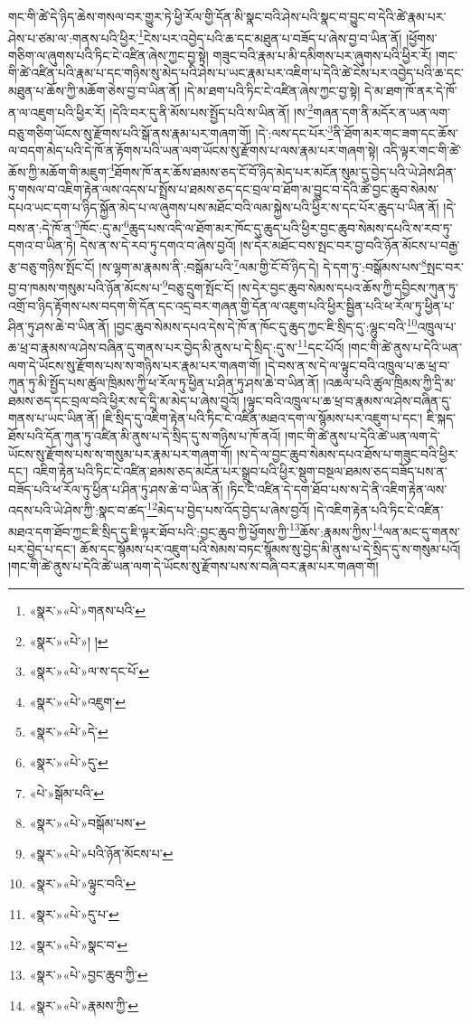 གང་གི་ཚེ་དེ་ཉིད་ཆེས་གསལ་བར་གྱུར་ཏེ་ཕྱི་རོལ་གྱི་དོན་མི་སྣང་བའི་ཤེས་པའི་སྣང་བ་བྱུང་བ་དེའི་ཚེ་རྣམ་པར་ཤེས་པ་ཙམ་ལ་:གནས་པའི་ཕྱིར་\footnote{«སྣར་»«པེ་»གནས་པའི་}ངེས་པར་འབྱེད་པའི་ཆ་དང་མཐུན་པ་བཟོད་པ་ཞེས་བྱ་བ་ཡིན་ནོ། །ཕྱོགས་གཅིག་ལ་ཞུགས་པའི་ཏིང་ངེ་འཛིན་ཞེས་ཀྱང་བྱ་སྟེ། གཟུང་བའི་རྣམ་པ་མི་དམིགས་པར་ཞུགས་པའི་ཕྱིར་རོ། །གང་གི་ཚེ་འཛིན་པའི་རྣམ་པ་དང་གཉིས་སུ་མེད་པའི་ཤེས་པ་ཡང་རྣམ་པར་འཇིག་པ་དེའི་ཚེ་ངེས་པར་འབྱེད་པའི་ཆ་དང་མཐུན་པ་ཆོས་ཀྱི་མཆོག་ཅེས་བྱ་བ་ཡིན་ནོ། །དེ་མ་ཐག་པའི་ཏིང་ངེ་འཛིན་ཞེས་ཀྱང་བྱ་སྟེ། དེ་མ་ཐག་ཁོ་ནར་དེ་ཁོ་ན་ལ་འཇུག་པའི་ཕྱིར་རོ། །དེའི་བར་དུ་ནི་མོས་པས་སྤྱོད་པའི་ས་ཡིན་ནོ། །ས་\footnote{«སྣར་»«པེ་»། །}གཞན་དག་ནི་མདོར་ན་ཡན་ལག་བཅུ་གཅིག་ཡོངས་སུ་རྫོགས་པའི་སྒོ་ནས་རྣམ་པར་གཞག་གོ། །དེ་:ལས་དང་པོར་\footnote{«སྣར་»«པེ་»ལ་ས་དང་པོ་}ནི་ཐོག་མར་གང་ཟག་དང་ཆོས་ལ་བདག་མེད་པའི་དེ་ཁོ་ན་རྟོགས་པའི་ཡན་ལག་ཡོངས་སུ་རྫོགས་པ་ལས་རྣམ་པར་གཞག་སྟེ། འདི་ལྟར་གང་གི་ཚེ་ཆོས་ཀྱི་མཆོག་གི་མཇུག་\footnote{«སྣར་»«པེ་»འཇུག་}ཐོགས་ཁོ་ནར་ཆོས་ཐམས་ཅད་ངོ་བོ་ཉིད་མེད་པར་མངོན་སུམ་དུ་བྱེད་པའི་ཡེ་ཤེས་ཤིན་ཏུ་གསལ་བ་འཇིག་རྟེན་ལས་འདས་པ་སྤྲོས་པ་ཐམས་ཅད་དང་བྲལ་བ་ཐོག་མ་བྱུང་བ་དེའི་ཚེ་བྱང་ཆུབ་སེམས་དཔའ་ཡང་དག་པ་ཉིད་སྐྱོན་མེད་པ་ལ་ཞུགས་པས་མཐོང་བའི་ལམ་སྐྱེས་པའི་ཕྱིར་ས་དང་པོར་ཆུད་པ་ཡིན་ནོ། །དེ་བས་ན་:དེ་ཁོ་ན་\footnote{«སྣར་»«པེ་»དེ་}ཁོང་:དུ་མ་\footnote{«སྣར་»«པེ་»དུ་}ཆུད་པས་འདི་ལ་ཐོག་མར་ཁོང་དུ་ཆུད་པའི་ཕྱིར་བྱང་ཆུབ་སེམས་དཔའི་ས་རབ་ཏུ་དགའ་བ་ཡིན་ཏེ། དེས་ན་ས་དེ་རབ་ཏུ་དགའ་བ་ཞེས་བྱའོ། །ས་དེར་མཐོང་བས་སྤང་བར་བྱ་བའི་ཉོན་མོངས་པ་བརྒྱ་རྩ་བཅུ་གཉིས་སྤོང་ངོ། །ས་ལྷག་མ་རྣམས་ནི་:བསྒོམ་པའི་\footnote{«པེ་»སྒོམ་པའི་}ལམ་གྱི་ངོ་བོ་ཉིད་དེ། དེ་དག་ཏུ་:བསྒོམས་པས་\footnote{«སྣར་»«པེ་»བསྒོམ་པས་}སྤང་བར་བྱ་བ་ཁམས་གསུམ་པའི་ཉོན་མོངས་པ་\footnote{«སྣར་»«པེ་»པའི་ཉོན་མོངས་པ་}བཅུ་དྲུག་སྤོང་ངོ། །ས་དེར་བྱང་ཆུབ་སེམས་དཔའ་ཆོས་ཀྱི་དབྱིངས་ཀུན་ཏུ་འགྲོ་བ་ཉིད་རྟོགས་པས་བདག་གི་དོན་དང་འདྲ་བར་གཞན་གྱི་དོན་ལ་འཇུག་པའི་ཕྱིར་སྦྱིན་པའི་ཕ་རོལ་ཏུ་ཕྱིན་པ་ཤིན་ཏུ་ཤས་ཆེ་བ་ཡིན་ནོ། །བྱང་ཆུབ་སེམས་དཔའ་དེས་དེ་ཁོ་ན་ཁོང་དུ་ཆུད་ཀྱང་ཇི་སྲིད་དུ་:ལྷུང་བའི་\footnote{«སྣར་»«པེ་»ལྟུང་བའི་}འཁྲུལ་པ་ཆ་ཕྲ་བ་རྣམས་ལ་ཤེས་བཞིན་དུ་གནས་པར་བྱེད་མི་ནུས་པ་དེ་སྲིད་:དུ་ས་\footnote{«སྣར་»«པེ་»དུ་པ་}དང་པོའོ། །གང་གི་ཚེ་ནུས་པ་དེའི་ཡན་ལག་དེ་ཡོངས་སུ་རྫོགས་པས་ས་གཉིས་པར་རྣམ་པར་གཞག་གོ། །དེ་བས་ན་ས་དེ་ལ་ལྟུང་བའི་འཁྲུལ་པ་ཆ་ཕྲ་བ་ཀུན་ཏུ་མི་སྤྱོད་པས་ཚུལ་ཁྲིམས་ཀྱི་ཕ་རོལ་ཏུ་ཕྱིན་པ་ཤིན་ཏུ་ཤས་ཆེ་བ་ཡིན་ནོ། །འཆལ་པའི་ཚུལ་ཁྲིམས་ཀྱི་དྲི་མ་ཐམས་ཅད་དང་བྲལ་བའི་ཕྱིར་ས་དེ་དྲི་མ་མེད་པ་ཞེས་བྱའོ། །ལྟུང་བའི་འཁྲུལ་པ་ཆ་ཕྲ་བ་རྣམས་ལ་ཤེས་བཞིན་དུ་གནས་པ་ཡང་ཡིན་ནོ། །ཇི་སྲིད་དུ་འཇིག་རྟེན་པའི་ཏིང་ངེ་འཛིན་མཐའ་དག་ལ་སྙོམས་པར་འཇུག་པ་དང་། ཇི་སྐད་ཐོས་པའི་དོན་ཀུན་ཏུ་འཛིན་མི་ནུས་པ་དེ་སྲིད་དུ་ས་གཉིས་པ་ཁོ་ནའོ། །གང་གི་ཚེ་ནུས་པ་དེའི་ཚེ་ཡན་ལག་དེ་ཡོངས་སུ་རྫོགས་པས་ས་གསུམ་པར་རྣམ་པར་གཞག་གོ། །ས་དེ་ལ་བྱང་ཆུབ་སེམས་དཔའ་ཐོས་པ་གཟུང་བའི་ཕྱིར་དང་། འཇིག་རྟེན་པའི་ཏིང་ངེ་འཛིན་ཐམས་ཅད་མངོན་པར་སྒྲུབ་པའི་ཕྱིར་སྡུག་བསྔལ་ཐམས་ཅད་བཟོད་པས་ན་བཟོད་པའི་ཕ་རོལ་ཏུ་ཕྱིན་པ་ཤིན་ཏུ་ཤས་ཆེ་བ་ཡིན་ནོ། །ཏིང་ངེ་འཛིན་དེ་དག་ཐོབ་པས་ས་དེ་ནི་འཇིག་རྟེན་ལས་འདས་པའི་ཡེ་ཤེས་ཀྱི་:སྣང་བ་ཚད་\footnote{«སྣར་»«པེ་»སྣང་བ་}མེད་པ་བྱེད་པས་འོད་བྱེད་པ་ཞེས་བྱའོ། །དེ་འཇིག་རྟེན་པའི་ཏིང་ངེ་འཛིན་མཐའ་དག་ཐོབ་ཀྱང་ཇི་སྲིད་དུ་ཇི་ལྟར་ཐོབ་པའི་:བྱང་ཆུབ་ཀྱི་ཕྱོགས་ཀྱི་\footnote{«སྣར་»«པེ་»བྱང་ཆུབ་ཀྱི་}ཆོས་:རྣམས་ཀྱིས་\footnote{«སྣར་»«པེ་»རྣམས་ཀྱི་}ལན་མང་དུ་གནས་པར་བྱེད་པ་དང་། ཆོས་དང་སྙོམས་པར་འཇུག་པའི་སེམས་བཏང་སྙོམས་སུ་བྱེད་མི་ནུས་པ་དེ་སྲིད་དུ་ས་གསུམ་པའོ། །གང་གི་ཚེ་ནུས་པ་དེའི་ཚེ་ཡན་ལག་དེ་ཡོངས་སུ་རྫོགས་པས་ས་བཞི་བར་རྣམ་པར་གཞག་གོ། 
